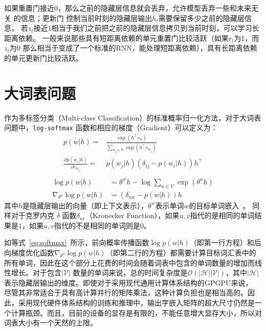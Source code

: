 如果重置门接近0，那么之前的隐藏层信息就会丢弃，允许模型丢弃一些和未来无关 的信息；更新门 控制当前时刻的隐藏层输出$h_t$需要保留多少之前的隐藏层信息， 若$z_t$接近1相当于我们之前把之前的隐藏层信息拷贝到当前时刻，可以学习长距离依赖。 一般来说那些具有短距离依赖的单元重置门比较活跃（如果$r_t$为1，而$z_t$为$0$ 那么相当于变成了一个标准的RNN，能处理短距离依赖），具有长距离依赖的单元更新门比较活跃。



\section{大词表问题}
作为多标签分类（Multi-class Classification）的标准概率归一化方法，对于大词表问题中，\texttt{log-softmax} 函数和相应的梯度（Gradient）可以定义为：
\begin{equation}
\begin{split}
p(w|h)=&\frac{\exp(h^\top v_{w})}{\sum_{w_j\in \mathcal{V}}{\exp(h^\top v_{w_j} )}} \\
\frac{\partial p(w_i|h)}{\partial v_{w_j}}=&p(w_j|h)(\delta_{ij}-p(w_i|h))h^\top\\
\end{split}
\end{equation}
\begin{equation}
\label{eq:softmax}
\begin{split}
\log p(w|h) &= \theta^w h-\log \sum_{u\in \mathcal{V}}{\exp(\theta^u h)}\\
\nabla_{\theta^u}{\log p(w|h)}&= (\delta_{uw}-p(w|h))h
\end{split}
\end{equation}
其中$ h $是隐藏层输出的向量（即上下文表示），$ \theta ^ w $表示单词$ w $的目标单词嵌入~。 同样对于克罗内克 $\delta$ 函数$ \delta_ {uv} $（Kronecker Function），如果$ u,v $指代的是相同的单词结果是$ 1 $，如果$ u,v $指代的不是相同的单词则是$ 0 $。


如等式~\ref{eq:softmax}~所示，前向概率传播函数$\log p(w|h) $（即第一行方程）和后向梯度优化函数$\nabla_{\theta^u}{\log p(w|h)}$（即第二行的方程）都需要计算目标词汇表中的所有单词，因此在这个部分上花费的时间会随着词表中包含的单词数量的增加而线性增长。对于包含$ \mathcal{| V |} $ 数量的单词来说，总的时间复杂度是$ \mathcal {O}(\mathcal {| H || V |})$，其中$ \mathcal {| H |} $表示隐藏层输出的维度。即使对于采用现代通用计算体系结构的GPGPU来说， 尽管其非常适合于具有高计算并行的矩阵乘法，这种计算负担也是相当高的。因此，采用现代硬件体系结构的训练和推理中，输出字嵌入矩阵的超大尺寸仍然是一个计算瓶颈。而且，目前的设备的显存是有限的，不能任意增大显存大小，所以对词表大小有一个天然的上限。

